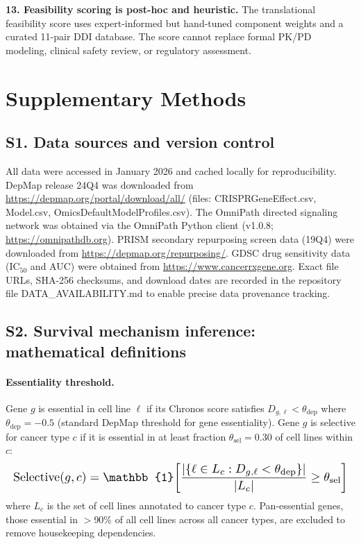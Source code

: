 \documentclass[11pt]{article}
\begin{document}
\textbf{13. Feasibility scoring is post-hoc and heuristic.} The translational feasibility score uses expert-informed but hand-tuned component weights and a curated 11-pair DDI database. The score cannot replace formal PK/PD modeling, clinical safety review, or regulatory assessment.


\section{Supplementary Methods}

\subsection{S1. Data sources and version control}
All data were accessed in January 2026 and cached locally for reproducibility. DepMap release 24Q4 was downloaded from \url{https://depmap.org/portal/download/all/} (files: CRISPRGeneEffect.csv, Model.csv, OmicsDefaultModelProfiles.csv). The OmniPath directed signaling network was obtained via the OmniPath Python client (v1.0.8; \url{https://omnipathdb.org}). PRISM secondary repurposing screen data (19Q4) were downloaded from \url{https://depmap.org/repurposing/}. GDSC drug sensitivity data (IC$_{50}$ and AUC) were obtained from \url{https://www.cancerrxgene.org}. Exact file URLs, SHA-256 checksums, and download dates are recorded in the repository file DATA\_AVAILABILITY.md to enable precise data provenance tracking.

\subsection{S2. Survival mechanism inference: mathematical definitions}

\paragraph{Essentiality threshold.} Gene $g$ is essential in cell line $\ell$ if its Chronos score satisfies $D_{g,\ell} < \theta_{\text{dep}}$ where $\theta_{\text{dep}} = -0.5$ (standard DepMap threshold for gene essentiality). Gene $g$ is selective for cancer type $c$ if it is essential in at least fraction $\theta_{\text{sel}} = 0.30$ of cell lines within $c$:
\[
\resizebox{\columnwidth}{!}{$\displaystyle
\text{Selective}(g, c) = \mathbb{1}\!\left[\frac{|\{\ell \in L_c : D_{g,\ell} < \theta_{\text{dep}}\}|}{|L_c|} \geq \theta_{\text{sel}}\right]
$}
\]
where $L_c$ is the set of cell lines annotated to cancer type $c$. Pan-essential genes, those essential in $>$90\% of all cell lines across all cancer types, are excluded to remove housekeeping dependencies.
\end{document}
